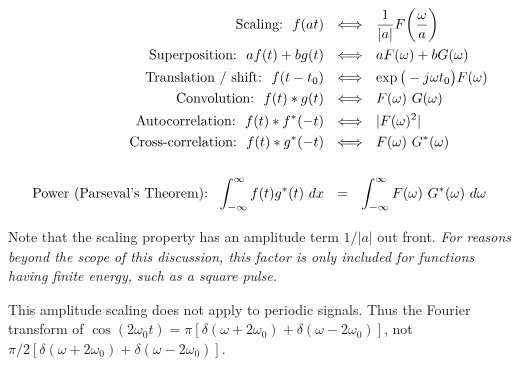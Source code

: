 \documentclass[11pt]{report}
\begin{document}
\begin{equation*}
\begin{split}
\text{Scaling:}~~f(at)~~&\Longleftrightarrow~~\frac{1}{|a|}F\bigg{(}\frac{\omega}{a}\bigg{)}\\
\text{Superposition:}~~af(t)+bg(t)~~&\Longleftrightarrow~~aF(\omega)+bG(\omega)\\
\text{Translation~/~shift:}~~f(t-t_0)~~&\Longleftrightarrow~~\exp\big{(}-j\omega
t_0\big{)}F(\omega)\\
\text{Convolution:}~~f(t)\ast
g(t)~~&\Longleftrightarrow~~F(\omega)~G(\omega)\\
\text{Autocorrelation:}~~f(t)\ast
f^\ast(-t)~~&\Longleftrightarrow~~|F(\omega)^2|\\
\text{Cross-correlation:}~~f(t)\ast
g^\ast(-t)~~&\Longleftrightarrow~~F(\omega)~G^{\ast}(\omega)\\
\\
\text{Power (Parseval's Theorem):}~~\int^{\infty}_{-\infty}f(t)g^{\ast}(t)~dx~~&=~~
\int^{\infty}_{-\infty}F(\omega)~G^{\ast}(\omega)~d\omega
\end{split}
\end{equation*}

Note that the scaling property has an amplitude term $1/|a|$ out
front.  \textit{For reasons beyond the scope of this discussion, this
factor is only included for functions having finite energy, such as a
square pulse.}

This amplitude scaling  does not apply to periodic signals.  Thus the
Fourier transform of $\cos(2\omega_0 t) = \pi[\delta(\omega +
2\omega_0) + \delta(\omega - 2\omega_0)]$, not $\pi/2[\delta(\omega +
2\omega_0) + \delta(\omega - 2\omega_0)]$.
\end{document}
